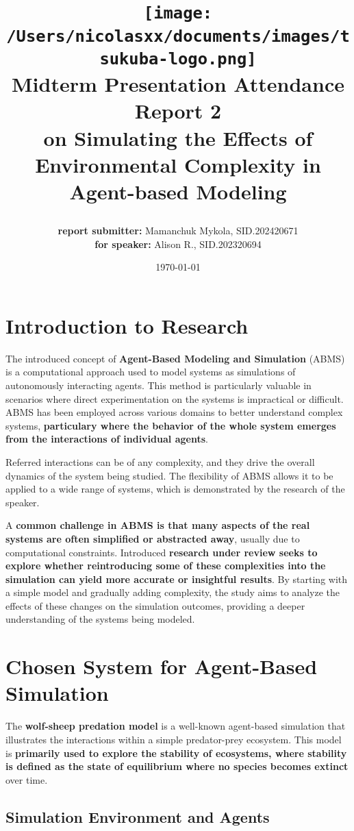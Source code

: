 \documentclass[12pt,a4paper]{article}
\title{
    \texttt{[image: /Users/nicolasxx/documents/images/tsukuba-logo.png]} \\
    \textbf{Midterm Presentation Attendance} \\
    \vspace{3mm}    
    Report 2 \\
    on Simulating the Effects of
    Environmental Complexity in
    Agent-based Modeling

\author{\textbf{report submitter: }Mamanchuk Mykola, SID.202420671 \\
\textbf{      for speaker: }Alison R., SID.202320694}
\date{\today}
}
\begin{document}
\maketitle


\section{Introduction to Research}
The introduced concept of \textbf{Agent-Based Modeling and Simulation} (ABMS) is a computational approach used to model systems as simulations of autonomously interacting agents. This method is particularly valuable in scenarios where direct experimentation on the systems is impractical or difficult. ABMS has been employed across various domains to better understand complex systems, \textbf{particulary where the behavior of the whole system emerges from the interactions of individual agents}.

Referred interactions can be of any complexity, and they drive the overall dynamics of the system being studied. The flexibility of ABMS allows it to be applied to a wide range of systems, which is demonstrated by the research of the speaker.

A \textbf{common challenge in ABMS is that many aspects of the real systems are often simplified or abstracted away}, usually due to computational constraints. Introduced \textbf{research under review seeks to explore whether reintroducing some of these complexities into the simulation can yield more accurate or insightful results}. By starting with a simple model and gradually adding complexity, the study aims to analyze the effects of these changes on the simulation outcomes, providing a deeper understanding of the systems being modeled.

\section{Chosen System for Agent-Based Simulation}

The \textbf{wolf-sheep predation model} is a well-known agent-based simulation that illustrates the interactions within a simple predator-prey ecosystem. This model is \textbf{primarily used to explore the stability of ecosystems, where stability is defined as the state of equilibrium where no species becomes extinct} over time.

\subsection{Simulation Environment and Agents}
\end{document}

